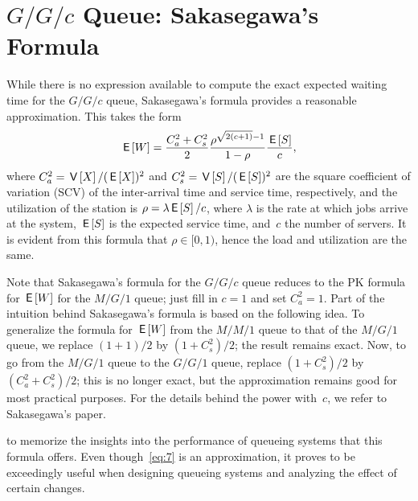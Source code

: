 \documentclass[stochastic-or.tex]{subfiles}
\begin{document}
\section{\texorpdfstring{$G/G/c$}{GGC} Queue: Sakasegawa's Formula}\label{sec:gg1}


While there is no expression available to compute the exact expected waiting time for the $G/G/c$ queue, Sakasegawa's formula provides a reasonable approximation.
This takes the form
\begin{equation}\label{eq:7}
 \,\mathsf{E}\left[W\right] = \frac{C_a^2+C_s^2}2 \frac{\rho^{\sqrt{2(c+1)}-1}}{1-\rho} \frac{\,\mathsf{E}\left[S\right]}{c},
\end{equation}
where $C_a^2 = \,\mathsf{V}\left[X\right]/(\,\mathsf{E}\left[X\right] )^2$ and $C_s^2=\,\mathsf{V}\left[S\right]/(\,\mathsf{E}\left[S\right])^2$ are the square coefficient of variation (SCV) of the inter-arrival time and service time, respectively, and the utilization of the station
is $\rho = \lambda \,\mathsf{E}\left[S\right]/c$, where $\lambda$ is the rate at which jobs arrive at the system, $\,\mathsf{E}\left[S\right]$ is the expected service time, and~$c$ the number of servers. It is evident from this formula that $\rho \in[0, 1)$, hence the load and utilization are the same.


Note that Sakasegawa's formula for the $G/G/c$ queue reduces to the PK formula for $\,\mathsf{E}\left[W\right]$ for the $M/G/1$ queue; just fill in $c=1$ and set $C_a^2=1$.
Part of the intuition behind Sakasegawa's formula is based on the following idea.
To generalize the formula for $\,\mathsf{E}\left[W\right]$ from the $M/M/1$ queue to that of the $M/G/1$ queue, we replace $(1+1)/2$ by $(1+C_{s}^{2})/2$; the result remains exact.
Now, to go from the $M/G/1$ queue to the $G/G/1$ queue, replace $(1+C_{s}^{2})/2$ by $(C_a^2+C_s^2)/2$; this is no longer exact, but the approximation remains good for most practical purposes. For the details behind the power with~$c$, we refer to Sakasegawa's paper.


 to memorize the insights into the performance of queueing systems that this formula offers.
Even though~\cref{eq:7} is an approximation, it proves to be exceedingly useful when designing queueing systems and analyzing the effect of certain changes.
\end{document}

